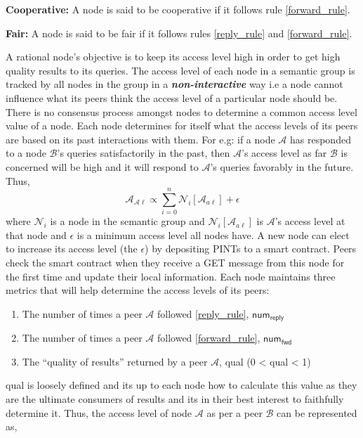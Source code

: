 \begin{definition}{\textbf{Cooperative:}}
	A node is said to be cooperative if it follows rule \ref{forward_rule}.
\end{definition}
\begin{definition}{\textbf{Fair:}}
	A node is said to be fair if it follows rules \ref{reply_rule} and \ref{forward_rule}.
\end{definition}
A rational node's objective is to keep its access level high in order to get high quality results to its queries. The access level of each node in a semantic group is tracked by all nodes in the group in a \textit{\textbf{non-interactive}} way i.e a node cannot influence what its peers think the access level of a particular node should be. There is no consensus process amongst nodes to determine a common access level value of a node. Each node determines for itself what the access levels of its peers are based on its past interactions with them. For e.g: if a node $\mathcal{A}$ has responded to a node $\mathcal{B}$'s queries satisfactorily in the past, then $\mathcal{A}$'s access level as far $\mathcal{B}$ is concerned will be high and it will respond to $\mathcal{A}$'s queries favorably in the future. Thus,
\newline
$$ \mathcal{A}_{\mathcal{A}\ell} \propto \sum_{i=0}^{n} \mathcal{N}_i[\mathcal{A}_{a\ell}] + \epsilon$$ 
where $\mathcal{N}_i$ is a node in the semantic group and $\mathcal{N}_i[\mathcal{A}_{a\ell}]$ is $\mathcal{A}$'s access level at that node and $\epsilon$ is a minimum access level all nodes have. A new node can elect to increase its access level (the $\epsilon$) by depositing \textsf{PINT}s to a smart contract. Peers check the smart contract when they receive a \textsf{GET} message from this node for the first time and update their local information. Each node maintains three metrics that will help determine the access levels of its peers:
\begin{enumerate}
	\item The number of times a peer $\mathcal{A}$ followed \ref{reply_rule}, $\textsf{num}_\textsf{reply}$
	\item The number of times a peer $\mathcal{A}$ followed \ref{forward_rule}, $\textsf{num}_\textsf{fwd}$
	\item The ``quality of results'' returned by a peer $\mathcal{A}$, \textsf{qual (0 < qual < 1)}
\end{enumerate}
\textsf{qual} is loosely defined and its up to each node how to calculate this value as they are the ultimate consumers of results and its in their best interest to faithfully determine it. Thus, the access level of node $\mathcal{A}$ as per a peer $\mathcal{B}$ can be represented as,

